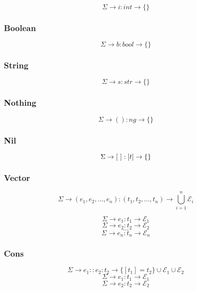 \documentclass[titlepage]{article}
\begin{document}
$$\Sigma \rightarrow i : int \rightarrow \{\}$$

\subsubsection{Boolean}

$$\Sigma \rightarrow b : bool \rightarrow \{\}$$

\subsubsection{String}

$$\Sigma \rightarrow s : str \rightarrow \{\}$$

\subsubsection{Nothing}

$$\Sigma \rightarrow () : ng \rightarrow \{\}$$

\subsubsection{Nil}

$$\Sigma \rightarrow [ \text{ } ] : [\space t \space ] \rightarrow \{\}$$



\subsubsection{Vector}

$$\Sigma \rightarrow (e_1, e_2, \dots, e_n) : (t_1, t_2, \dots, t_n) \rightarrow \bigcup_{i = 1} ^ n \mathcal{E}_i$$
\noindent\makebox[\linewidth]{\rule{3.15in}{0.4pt}}

$$\Sigma \rightarrow e_1 : t_1 \rightarrow \mathcal{E}_1$$
$$\Sigma \rightarrow e_2 : t_2 \rightarrow \mathcal{E}_2$$
$$\dots$$
$$\Sigma \rightarrow e_n : t_n \rightarrow \mathcal{E}_n$$

\subsubsection{Cons}

$$\Sigma \rightarrow e_1 :: e_2 : t_2 \rightarrow \{[t_1] = t_2\} \cup \mathcal{E}_1 \cup \mathcal{E}_2$$
\noindent\makebox[\linewidth]{\rule{2.8in}{0.4pt}}
$$\Sigma \rightarrow e_1 : t_1 \rightarrow \mathcal{E}_1$$
$$\Sigma \rightarrow e_2 : t_2 \rightarrow \mathcal{E}_2$$
\end{document}
